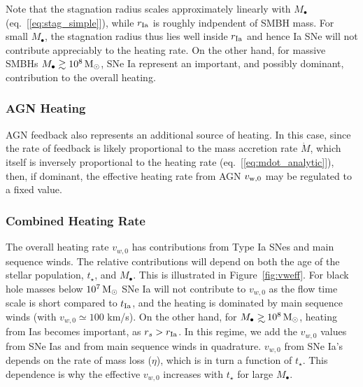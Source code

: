 \documentclass[usenatbib,fleqn]{mn2e}
\newcommand\gsim{\mathrel{\rlap{\lower4pt\hbox{\hskip1pt$\sim$}}
    \raise1pt\hbox{$>$}}}
\newcommand{\rs}{r_s}
\newcommand{\Mbh}[1][]{M_{\bullet#1}}
\newcommand{\rIa}{r_{\rm Ia}}
\newcommand{\vwO}{v_{w,0}}
\newcommand{\tage}{t_{\star}}
\begin{document}
Note that the stagnation radius scales approximately linearly with $M_{\bullet}$ (eq.~[\ref{eq:stag_simple}]), while $\rIa$ is roughly indpendent of SMBH mass.  For small $\Mbh$, the stagnation radius thus lies well inside $\rIa$ and hence Ia SNe will not contribute appreciably to the heating rate.  On the other hand, for massive SMBHs $M_{\bullet} \gtrsim 10^8 \,{\rm M_\odot}$, SNe Ia  represent an important, and possibly dominant, contribution to the overall heating.

\subsubsection{AGN Heating}

AGN feedback also represents an additional source of heating.  In this case, since the rate of feedback is likely proportional to the mass accretion rate $\dot{M}$, which itself is inversely proportional to the heating rate (eq.~[\ref{eq:mdot_analytic}]), then, if dominant, the effective heating rate from AGN $v_{\rm w,0}$ may be regulated to a fixed value.  

\subsubsection{Combined Heating Rate} The overall heating rate $\vwO$ has contributions from Type Ia SNes and main sequence winds.  The relative contributions will depend on both the age of the stellar population, $\tage$, and $\Mbh$.  This is illustrated in Figure~\ref{fig:vweff}. For black hole masses below $10^7 \,{\rm M_\odot}$ SNe
  Ia will not contribute to $\vwO$ as the flow time scale is short
  compared to $t_{\rm Ia}$, and the heating is dominated by main
  sequence winds (with $\vwO\simeq 100$ km/s).  On the other hand, for
  $\Mbh \gsim 10^8 \Msun$, heating from Ias becomes important, as
  $\rs>\rIa$. In this regime, we add the $\vwO$ values from SNe Ias
  and from main sequence winds in quadrature. $\vwO$ from SNe Ia's
  depends on the rate of mass loss ($\eta$), which is in turn a
  function of $t_{\star}$. This dependence is why the effective
  $\vwO$ increases with $\tage$ for large $\Mbh$.
\end{document}
